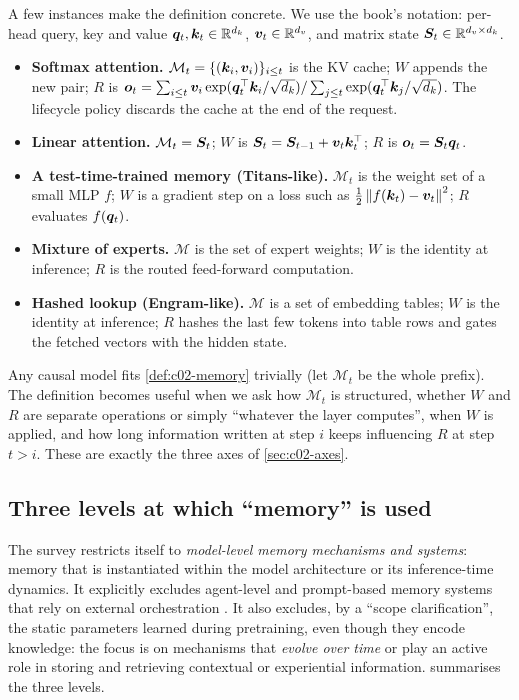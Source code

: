A few instances make the definition concrete. We use the book's notation: per-head query, key and
value $\bm{q}_t, \bm{k}_t \in \mathbb{R}^{d_k}$, $\bm{v}_t \in \mathbb{R}^{d_v}$, and matrix state
$\bm{S}_t \in \mathbb{R}^{d_v \times d_k}$.
\begin{itemize}
  \item \textbf{Softmax attention.} $\mathcal{M}_t = \{(\bm{k}_i, \bm{v}_i)\}_{i \le t}$ is the KV cache;
        $W$ appends the new pair; $R$ is
        $\bm{o}_t = \sum_{i \le t} \bm{v}_i \exp(\bm{q}_t^{\top}\bm{k}_i/\sqrt{d_k}) / \sum_{j\le t}\exp(\bm{q}_t^{\top}\bm{k}_j/\sqrt{d_k})$.
        The lifecycle policy discards the cache at the end of the request.
  \item \textbf{Linear attention.} $\mathcal{M}_t = \bm{S}_t$; $W$ is $\bm{S}_t = \bm{S}_{t-1} + \bm{v}_t\bm{k}_t^{\top}$;
        $R$ is $\bm{o}_t = \bm{S}_t\bm{q}_t$.
  \item \textbf{A test-time-trained memory (Titans-like).} $\mathcal{M}_t$ is the weight set of
        a small MLP $f$; $W$ is a gradient step on a loss such as
        $\tfrac12\left\lVert f(\bm{k}_t) - \bm{v}_t\right\rVert^2$; $R$ evaluates $f(\bm{q}_t)$.
  \item \textbf{Mixture of experts.} $\mathcal{M}$ is the set of expert weights; $W$ is the
        identity at inference; $R$ is the routed feed-forward computation.
  \item \textbf{Hashed lookup (Engram-like).} $\mathcal{M}$ is a set of embedding tables; $W$ is the
        identity at inference; $R$ hashes the last few tokens into table rows and gates the
        fetched vectors with the hidden state.
\end{itemize}
Any causal model fits \cref{def:c02-memory} trivially (let $\mathcal{M}_t$ be the whole prefix).
The definition becomes useful when we ask how $\mathcal{M}_t$ is structured, whether $W$ and $R$
are separate operations or simply ``whatever the layer computes'', when $W$ is applied, and how
long information written at step $i$ keeps influencing $R$ at step $t > i$. These are exactly
the three axes of \cref{sec:c02-axes}.

\subsection{Three levels at which ``memory'' is used}\label{sec:c02-levels}

The survey restricts itself to \emph{model-level memory mechanisms and systems}: memory that is
instantiated within the model architecture or its inference-time dynamics. It explicitly excludes
agent-level and prompt-based memory systems that rely on external orchestration
\citep[\S II]{zhoubian2026memory}. It also excludes, by a ``scope clarification'', the static
parameters learned during pretraining, even though they encode knowledge: the focus is on
mechanisms that \emph{evolve over time} or play an active role in storing and retrieving
contextual or experiential information.  summarises the three levels.

